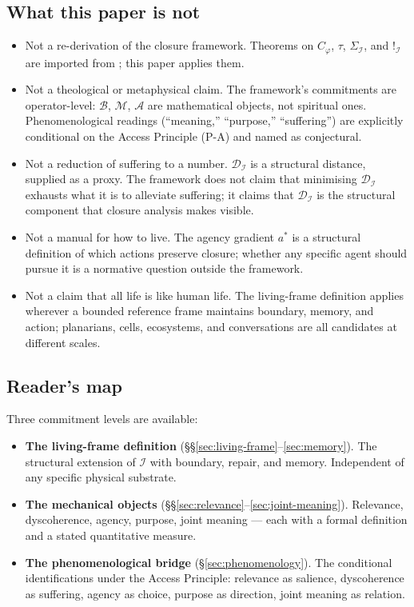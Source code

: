 \documentclass[11pt]{article}
\theoremstyle{plain}
\theoremstyle{definition}
\theoremstyle{remark}
\newcommand{\Ical}{\mathcal{I}}
\newcommand{\Mcal}{\mathcal{M}}
\newcommand{\Acal}{\mathcal{A}}
\newcommand{\Bcal}{\mathcal{B}}
\newcommand{\Dcal}{\mathcal{D}}
\newcommand{\Cph}{C_\varphi}
\begin{document}
\subsection{What this paper is not}

\begin{itemize}[leftmargin=2em]
\item Not a re-derivation of the closure framework. Theorems on $\Cph$, $\tau$, $\Sigma_\Ical$, and $!_\Ical$ are imported from \citet{SmartExistenceClosure}; this paper applies them.
\item Not a theological or metaphysical claim. The framework's commitments are operator-level: $\Bcal$, $\Mcal$, $\Acal$ are mathematical objects, not spiritual ones. Phenomenological readings (``meaning,'' ``purpose,'' ``suffering'') are explicitly conditional on the Access Principle (P-A) and named as conjectural.
\item Not a reduction of suffering to a number. $\Dcal_\Ical$ is a structural distance, supplied as a proxy. The framework does not claim that minimising $\Dcal_\Ical$ exhausts what it is to alleviate suffering; it claims that $\Dcal_\Ical$ is the structural component that closure analysis makes visible.
\item Not a manual for how to live. The agency gradient $a^*$ is a structural definition of which actions preserve closure; whether any specific agent should pursue it is a normative question outside the framework.
\item Not a claim that all life is like human life. The living-frame definition applies wherever a bounded reference frame maintains boundary, memory, and action; planarians, cells, ecosystems, and conversations are all candidates at different scales.
\end{itemize}

\subsection{Reader's map}

Three commitment levels are available:

\begin{itemize}[leftmargin=2em]
\item \textbf{The living-frame definition} (\S\S\ref{sec:living-frame}--\ref{sec:memory}). The structural extension of $\Ical$ with boundary, repair, and memory. Independent of any specific physical substrate.
\item \textbf{The mechanical objects} (\S\S\ref{sec:relevance}--\ref{sec:joint-meaning}). Relevance, dyscoherence, agency, purpose, joint meaning --- each with a formal definition and a stated quantitative measure.
\item \textbf{The phenomenological bridge} (\S\ref{sec:phenomenology}). The conditional identifications under the Access Principle: relevance as salience, dyscoherence as suffering, agency as choice, purpose as direction, joint meaning as relation.
\end{itemize}
\end{document}
